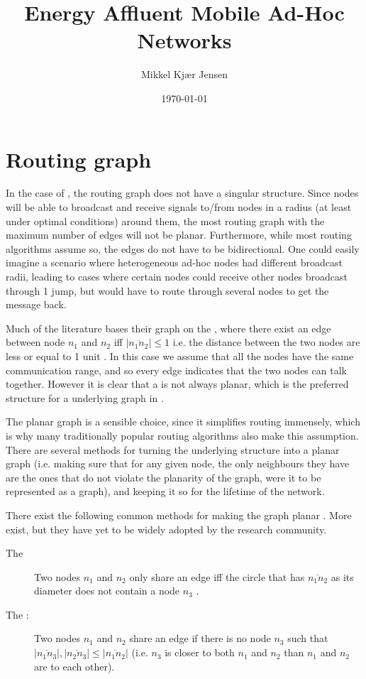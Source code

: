 \documentclass[letter, 12pt, english, draft]{article}
\title{Energy Affluent Mobile Ad-Hoc Networks}
\author{Mikkel Kjær Jensen}
\date{\today}
\begin{document}
\pagestyle{fancy}

\section{Routing graph}
In the case of \manet, the routing graph does not have a singular structure. Since nodes will be able to broadcast and receive signals to/from nodes in a radius (at least under optimal conditions) around them, the most routing graph with the maximum number of edges will not be planar. Furthermore, while most routing algorithms assume so, the edges do not have to be bidirectional. One could easily imagine a scenario where heterogeneous ad-hoc nodes had different broadcast radii, leading to cases where certain nodes could receive other nodes broadcast through 1 jump, but would have to route through several nodes to get the message back.

Much of the literature bases their graph on the \udg, where there exist an edge between node $n_1$ and $n_2$ iff $|\overline{n_1n_2}| \leq 1$ i.e. the distance between the two nodes are less or equal to 1 unit  \cite{gopher}. In this case we assume that all the nodes have the same communication range, and so every edge indicates that the two nodes can talk together. However it is clear that a \udg is not always planar, which is the preferred structure for a underlying graph in \anet. 

The planar graph is a sensible choice, since it simplifies routing immensely, which is why many traditionally popular routing algorithms also make this assumption. There are several methods for turning the underlying structure into a planar graph (i.e. making sure that for any given node, the only neighbours they have are the ones that do not violate the planarity of the graph, were it to be represented as a graph), and keeping it so for the lifetime of the network. 

There exist the following common methods for making the graph planar . More exist, but they have yet to be widely adopted by the research community.
\begin{description}
\item[The \gabe] Two nodes $n_1$ and $n_2$ only share an edge iff the circle that has $\overline{n_1n_2}$ as its diameter does not contain a node $n_3$ \cite{gopher}. 
\item[The \rng:] Two nodes $n_1$ and $n_2$ share an edge if there is no node $n_3$ such that $|\overline{n_1n_3}|, |\overline{n_2n_3}| \leq |\overline{n_1n_2}|$ (i.e. $n_3$ is closer to both $n_1$ and $n_2$ than $n_1$ and $n_2$ are to each other).
\end{description}
\end{document}
